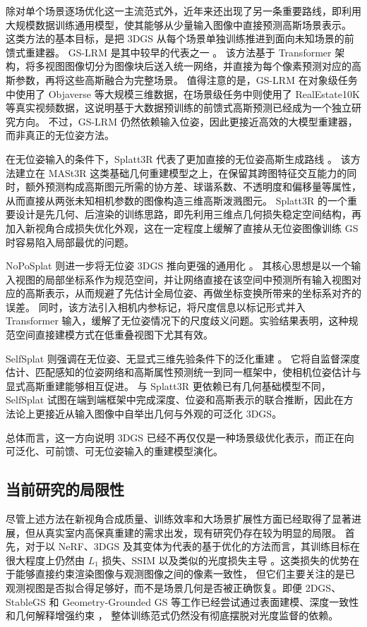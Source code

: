 除对单个场景逐场优化这一主流范式外，近年来还出现了另一条重要路线，即利用大规模数据训练通用模型，使其能够从少量输入图像中直接预测高斯场景表示。
这类方法的基本目标，是把 3DGS 从每个场景单独训练推进到面向未知场景的前馈式重建器。
GS-LRM 是其中较早的代表之一 \cite{zhang2024gslrm}。
该方法基于 Transformer 架构，将多视图图像切分为图像块后送入统一网络，并直接为每个像素预测对应的高斯参数，再将这些高斯融合为完整场景。
值得注意的是，GS-LRM 在对象级任务中使用了 Objaverse 等大规模三维数据，在场景级任务中则使用了 RealEstate10K 等真实视频数据，这说明基于大数据预训练的前馈式高斯预测已经成为一个独立研究方向。
不过，GS-LRM 仍然依赖输入位姿，因此更接近高效的大模型重建器，而非真正的无位姿方法。

在无位姿输入的条件下，Splatt3R 代表了更加直接的无位姿高斯生成路线 \cite{smart2024splatt3r}。
该方法建立在 MASt3R 这类基础几何重建模型之上，在保留其跨图特征交互能力的同时，额外预测构成高斯图元所需的协方差、球谐系数、不透明度和偏移量等属性，从而直接从两张未知相机参数的图像构造三维高斯泼溅图元。
Splatt3R 的一个重要设计是先几何、后渲染的训练思路，即先利用三维点几何损失稳定空间结构，再加入新视角合成损失优化外观，这在一定程度上缓解了直接从无位姿图像训练 GS 时容易陷入局部最优的问题。

NoPoSplat 则进一步将无位姿 3DGS 推向更强的通用化 \cite{ye2024noposplat}。
其核心思想是以一个输入视图的局部坐标系作为规范空间，并让网络直接在该空间中预测所有输入视图对应的高斯表示，从而规避了先估计全局位姿、再做坐标变换所带来的坐标系对齐的误差。
同时，该方法引入相机内参标记，将尺度信息以标记形式并入 Transformer 输入，缓解了无位姿情况下的尺度歧义问题。实验结果表明，这种规范空间直接建模方式在低重叠视图下尤其有效。

SelfSplat 则强调在无位姿、无显式三维先验条件下的泛化重建 \cite{kang2025selfsplat}。
它将自监督深度估计、匹配感知的位姿网络和高斯属性预测统一到同一框架中，使相机位姿估计与显式高斯重建能够相互促进。
与 Splatt3R 更依赖已有几何基础模型不同，SelfSplat 试图在端到端框架中完成深度、位姿和高斯表示的联合推断，因此在方法论上更接近从输入图像中自举出几何与外观的可泛化 3DGS。

总体而言，这一方向说明 3DGS 已经不再仅仅是一种场景级优化表示，而正在向可泛化、可前馈、可无位姿输入的重建模型演化。

\subsection{当前研究的局限性}

尽管上述方法在新视角合成质量、训练效率和大场景扩展性方面已经取得了显著进展，但从真实室内高保真重建的需求出发，现有研究仍存在较为明显的局限。
首先，对于以 NeRF、3DGS 及其变体为代表的基于优化的方法而言，其训练目标在很大程度上仍然由 \(L_1\) 损失、SSIM 以及类似的光度损失主导 \cite{mildenhall2021nerf,kerbl2023}。这类损失的优势在于能够直接约束渲染图像与观测图像之间的像素一致性，
但它们主要关注的是已观测视图是否拟合得足够好，而不是场景几何是否被正确恢复。即便 2DGS、StableGS 和 Geometry-Grounded GS 等工作已经尝试通过表面建模、深度一致性和几何解释增强约束 \cite{huang2024twodgs,wang2025stablegs,zhang2026geometrygroundedgs}，
整体训练范式仍然没有彻底摆脱对光度监督的依赖。

